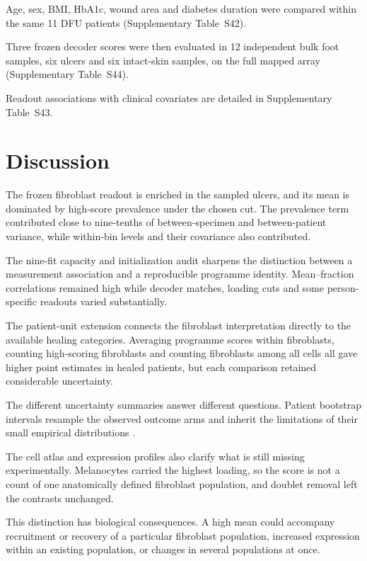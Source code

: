\documentclass[10pt,a4paper]{article}
\begin{document}
Age, sex, BMI, HbA1c, wound area and diabetes duration were compared within the same 11 DFU patients (Supplementary Table~S42).

Three frozen decoder scores were then evaluated in 12 independent bulk foot samples, six ulcers and six intact-skin samples, on the full mapped array (Supplementary Table~S44).

Readout associations with clinical covariates are detailed in Supplementary Table~S43.

\section{Discussion}

The frozen fibroblast readout is enriched in the sampled ulcers, and its mean is dominated by high-score prevalence under the chosen cut. The prevalence term contributed close to nine-tenths of between-specimen and between-patient variance, while within-bin levels and their covariance also contributed.

The nine-fit capacity and initialization audit sharpens the distinction between a measurement association and a reproducible programme identity. Mean--fraction correlations remained high while decoder matches, loading cuts and some person-specific readouts varied substantially.

The patient-unit extension connects the fibroblast interpretation directly to the available healing categories. Averaging programme scores within fibroblasts, counting high-scoring fibroblasts and counting fibroblasts among all cells all gave higher point estimates in healed patients, but each comparison retained considerable uncertainty.

The different uncertainty summaries answer different questions. Patient bootstrap intervals resample the observed outcome arms and inherit the limitations of their small empirical distributions \citep{efron1993}.

The cell atlas and expression profiles also clarify what is still missing experimentally. Melanocytes carried the highest loading, so the score is not a count of one anatomically defined fibroblast population, and doublet removal left the contrasts unchanged.

This distinction has biological consequences. A high mean could accompany recruitment or recovery of a particular fibroblast population, increased expression within an existing population, or changes in several populations at once.
\end{document}
